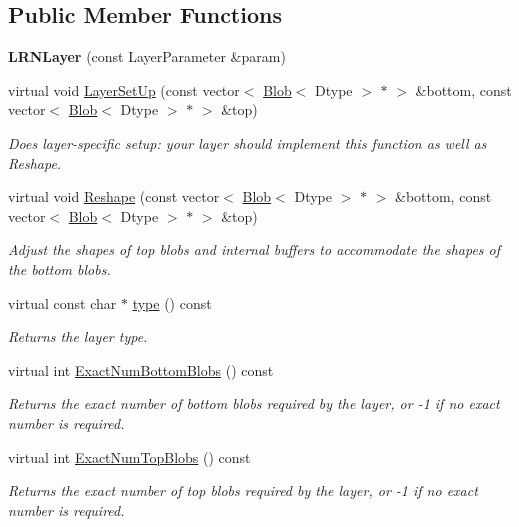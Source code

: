 \subsection*{Public Member Functions}
\begin{DoxyCompactItemize}
\item 
{\bfseries L\+R\+N\+Layer} (const Layer\+Parameter \&param)\hypertarget{classcaffe_1_1LRNLayer_a235b5f1b8fead8d1ddb9c29d627058fe}{}\label{classcaffe_1_1LRNLayer_a235b5f1b8fead8d1ddb9c29d627058fe}

\item 
virtual void \hyperlink{classcaffe_1_1LRNLayer_a7ab94b55392ad0500115d4a4d64b0a7c}{Layer\+Set\+Up} (const vector$<$ \hyperlink{classcaffe_1_1Blob}{Blob}$<$ Dtype $>$ $\ast$ $>$ \&bottom, const vector$<$ \hyperlink{classcaffe_1_1Blob}{Blob}$<$ Dtype $>$ $\ast$ $>$ \&top)
\begin{DoxyCompactList}\small\item\em Does layer-\/specific setup\+: your layer should implement this function as well as Reshape. \end{DoxyCompactList}\item 
virtual void \hyperlink{classcaffe_1_1LRNLayer_ae7ca62b2339f0691dadde24fd8acb481}{Reshape} (const vector$<$ \hyperlink{classcaffe_1_1Blob}{Blob}$<$ Dtype $>$ $\ast$ $>$ \&bottom, const vector$<$ \hyperlink{classcaffe_1_1Blob}{Blob}$<$ Dtype $>$ $\ast$ $>$ \&top)
\begin{DoxyCompactList}\small\item\em Adjust the shapes of top blobs and internal buffers to accommodate the shapes of the bottom blobs. \end{DoxyCompactList}\item 
virtual const char $\ast$ \hyperlink{classcaffe_1_1LRNLayer_a28dbd28c7542ae178973f0cb7b73cf8a}{type} () const \hypertarget{classcaffe_1_1LRNLayer_a28dbd28c7542ae178973f0cb7b73cf8a}{}\label{classcaffe_1_1LRNLayer_a28dbd28c7542ae178973f0cb7b73cf8a}

\begin{DoxyCompactList}\small\item\em Returns the layer type. \end{DoxyCompactList}\item 
virtual int \hyperlink{classcaffe_1_1LRNLayer_aabbbcdeb646c188ac2137b003aa1c682}{Exact\+Num\+Bottom\+Blobs} () const 
\begin{DoxyCompactList}\small\item\em Returns the exact number of bottom blobs required by the layer, or -\/1 if no exact number is required. \end{DoxyCompactList}\item 
virtual int \hyperlink{classcaffe_1_1LRNLayer_aab9056708727154a01866d17756c07cc}{Exact\+Num\+Top\+Blobs} () const 
\begin{DoxyCompactList}\small\item\em Returns the exact number of top blobs required by the layer, or -\/1 if no exact number is required. \end{DoxyCompactList}\end{DoxyCompactItemize}
